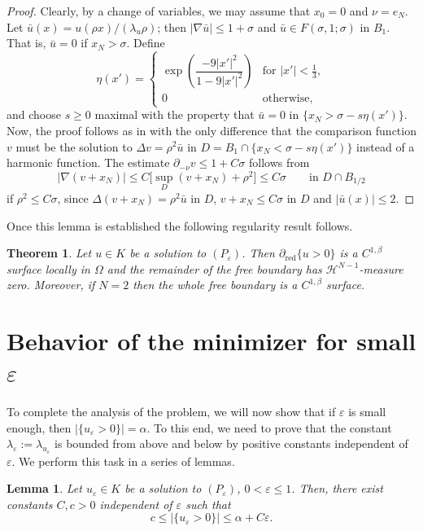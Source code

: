 \documentclass[11pt]{amsart}
\newtheorem{theorem}{Theorem}[section]
\newtheorem{lemma}{Lemma}[section]
\theoremstyle{definition}
\theoremstyle{remark}
\numberwithin{equation}{section}
\newcommand{\cH}{\mathcal{H}}
\newcommand{\red}{\mathrm{red}}
\begin{document}
\begin{proof}
Clearly, by a change of variables, we may assume that $x_0=0$ and $\nu=e_N$. Let $\bar u(x)=u(\rho x)/(\lambda_u\rho)$; then $|\nabla\bar u|\le1+\sigma$ and $\bar u\in F(\sigma,1;\sigma)$ in $B_1$. That is, $\bar u=0$ if $x_N>\sigma$. Define
\[
\eta(x')=\begin{cases}\exp\left(\dfrac{-9|x'|^2}{1-9|x'|^2}\right) & \text{for } |x'|<\frac13,\\[6pt] 0 & \text{otherwise},\end{cases}
\]
and choose $s\ge0$ maximal with the property that $\bar u=0$ in $\{x_N>\sigma-s\eta(x')\}$. Now, the proof follows as in \cite[Lemma~7.2]{AC} with the only difference that the comparison function $v$ must be the solution to $\Delta v=\rho^2\bar u$ in $D=B_1\cap\{x_N<\sigma-s\eta(x')\}$ instead of a harmonic function. The estimate $\partial_{-\nu}v\le1+C\sigma$ follows from
\[
|\nabla(v+x_N)|\le C\Big[\sup_D(v+x_N)+\rho^2\Big]\le C\sigma\qquad\text{in } D\cap B_{1/2}
\]
if $\rho^2\le C\sigma$, since $\Delta(v+x_N)=\rho^2\bar u$ in $D$, $v+x_N\le C\sigma$ in $D$ and $|\bar u(x)|\le2$.
\end{proof}

Once this lemma is established the following regularity result follows.

\begin{theorem}\label{t.fb}
Let $u\in K$ be a solution to $(P_\varepsilon)$. Then $\partial_\red\{u>0\}$ is a $C^{1,\beta}$ surface locally in $\Omega$ and the remainder of the free boundary has $\cH^{N-1}$-measure zero. Moreover, if $N=2$ then the whole free boundary is a $C^{1,\beta}$ surface.
\end{theorem}

\section{Behavior of the minimizer for small $\varepsilon$}\label{sec.small}

To complete the analysis of the problem, we will now show that if $\varepsilon$ is small enough, then $|\{u_\varepsilon>0\}|=\alpha$. To this end, we need to prove that the constant $\lambda_\varepsilon:=\lambda_{u_\varepsilon}$ is bounded from above and below by positive constants independent of $\varepsilon$. We perform this task in a series of lemmas.

\begin{lemma}\label{l.meas}
Let $u_\varepsilon\in K$ be a solution to $(P_\varepsilon)$, $0<\varepsilon\le1$. Then, there exist constants $C,c>0$ independent of $\varepsilon$ such that
\begin{equation}\label{41}
c\le|\{u_\varepsilon>0\}|\le\alpha+C\varepsilon.
\end{equation}
\end{lemma}
\end{document}
